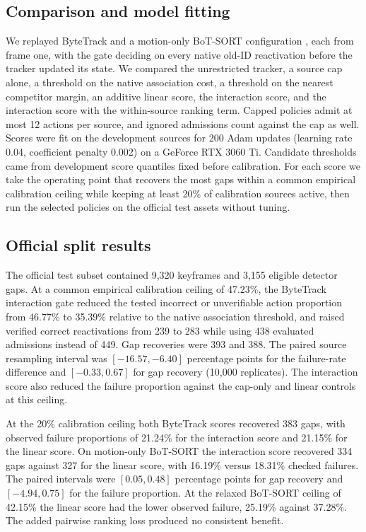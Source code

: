 \subsection{Comparison and model fitting}
We replayed ByteTrack \cite{zhang2022bytetrack} and a motion-only BoT-SORT
configuration \cite{aharon2022botsort}, each from frame one, with the gate
deciding on every native old-ID reactivation before the tracker updated
its state. We compared the unrestricted tracker, a source cap alone, a
threshold on the native association cost, a threshold on the nearest
competitor margin, an additive linear score, the interaction score, and
the interaction score with the within-source ranking term. Capped policies
admit at most 12 actions per source, and ignored admissions count against
the cap as well. Scores were fit on the development sources for 200
Adam updates (learning rate 0.04, coefficient penalty 0.002) on a GeForce
RTX 3060 Ti. Candidate thresholds came from development score quantiles
fixed before calibration. For each score we take the operating point that
recovers the most gaps within a common empirical calibration ceiling while
keeping at least 20\% of calibration sources active, then run the selected
policies on the official test assets without tuning.

\subsection{Official split results}
The official test subset contained 9,320 keyframes and 3,155 eligible
detector gaps. At a common empirical calibration ceiling of 47.23\%, the
ByteTrack interaction gate reduced the tested incorrect or unverifiable
action proportion from 46.77\% to 35.39\% relative to the native
association threshold, and raised verified correct reactivations from 239
to 283 while using 438 evaluated admissions instead of 449. Gap recoveries
were 393 and 388. The paired source resampling interval was
$[-16.57,-6.40]$ percentage points for the failure-rate difference and
$[-0.33,0.67]$ for gap recovery (10,000 replicates). The interaction score
also reduced the failure proportion against the cap-only and linear
controls at this ceiling.

At the 20\% calibration ceiling both ByteTrack scores recovered 383 gaps,
with observed failure proportions of 21.24\% for the interaction score and
21.15\% for the linear score. On motion-only BoT-SORT the interaction
score recovered 334 gaps against 327 for the linear score, with 16.19\%
versus 18.31\% checked failures. The paired intervals were $[0.05,0.48]$
percentage points for gap recovery and $[-4.94,0.75]$ for the failure
proportion. At the relaxed BoT-SORT ceiling of 42.15\% the linear score
had the lower observed failure, 25.19\% against 37.28\%. The added
pairwise ranking loss produced no consistent benefit.


